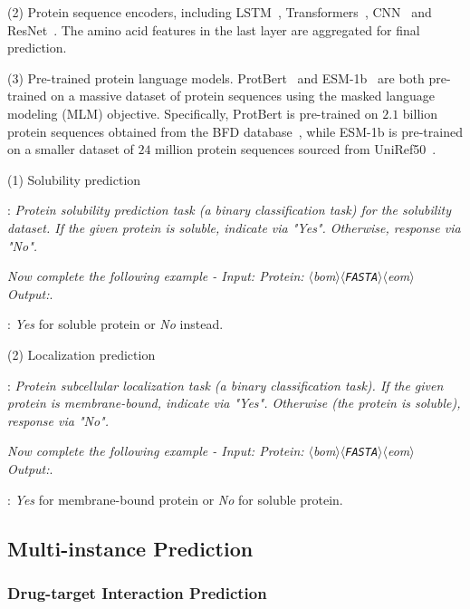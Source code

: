 \documentclass[11pt]{article}
\newcommand{\bop}{$\langle$bom$\rangle$}
\newcommand{\eop}{$\langle$eom$\rangle$}
\newcommand{\fasta}{$\langle$\texttt{FASTA}$\rangle$}
\begin{document}
\noindent(2) Protein sequence encoders, including LSTM~\citep{hochreiter1997long}, Transformers~\citep{vaswani2017attention}, CNN~\citep{o2015introduction} and ResNet~\citep{he2016deep}.
The amino acid features in the last layer are aggregated for final prediction.

\noindent(3) Pre-trained protein language models.
ProtBert~\citep{elnaggar2021prottrans} and ESM-1b~\citep{rives2021biological} are both pre-trained on a massive dataset of protein sequences using the masked language modeling (MLM) objective. 
Specifically, ProtBert is pre-trained on $2.1$ billion protein sequences obtained from the BFD database~\citep{steinegger2018clustering}, while ESM-1b is pre-trained on a smaller dataset of $24$ million protein sequences sourced from UniRef50~\citep{suzek2007uniref}.


\noindent(1) Solubility prediction

:
\textit{Protein solubility prediction task (a binary classification task) for the solubility dataset. If the given protein is soluble, indicate via "Yes". Otherwise, response via "No".}

\textit{Now complete the following example - Input: Protein: \bop{}\fasta{}\eop{} Output:}.

:
\textit{Yes} for soluble protein or \textit{No} instead.

\noindent(2) Localization prediction

:
\textit{Protein subcellular localization task (a binary classification task). If the given protein is membrane-bound, indicate via "Yes". Otherwise (the protein is soluble), response via "No".}

\textit{Now complete the following example - Input: Protein: \bop{}\fasta{}\eop{} Output:}.

:
\textit{Yes} for membrane-bound protein or \textit{No} for soluble protein.

\subsection{Multi-instance Prediction}
\subsubsection{Drug-target Interaction Prediction}
\end{document}

